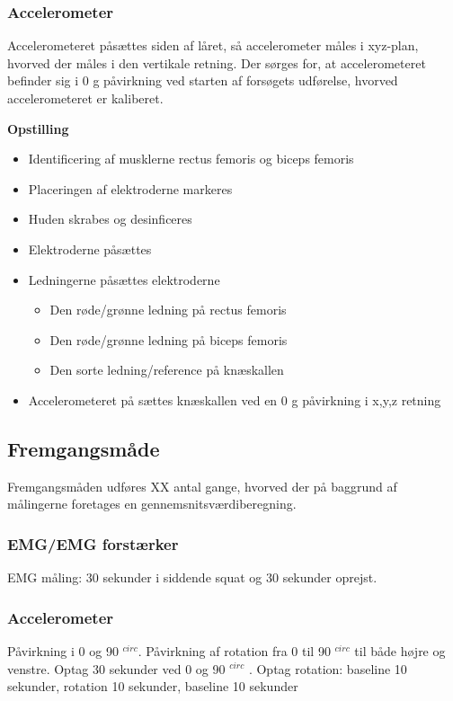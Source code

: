 \subsubsection{Accelerometer}
Accelerometeret påsættes siden af låret, så accelerometer måles i xyz-plan, hvorved der måles i den vertikale retning. Der sørges for,  at accelerometeret befinder sig i 0 g påvirkning ved starten af forsøgets udførelse, hvorved accelerometeret er kaliberet. 

\textbf{Opstilling}
\begin{itemize}
\item Identificering af musklerne rectus femoris og biceps femoris 
\item Placeringen af elektroderne markeres
\item Huden skrabes og desinficeres
\item Elektroderne påsættes
\item Ledningerne påsættes elektroderne
\begin{itemize}
\item Den røde/grønne ledning på rectus femoris
\item Den røde/grønne ledning på biceps femoris
\item Den sorte ledning/reference på knæskallen 
\end{itemize} 
\item Accelerometeret på sættes knæskallen ved en 0 g påvirkning i x,y,z retning
\end{itemize}


\subsection{Fremgangsmåde}
Fremgangsmåden udføres XX antal gange, hvorved der på baggrund af målingerne foretages en gennemsnitsværdiberegning.

\subsubsection{EMG/EMG forstærker}
EMG måling: 30 sekunder i siddende squat og 30 sekunder oprejst.

\subsubsection{Accelerometer}
Påvirkning i 0 og 90 $^{circ}$.
Påvirkning af rotation fra 0 til 90 $^{circ}$ til både højre og venstre.
Optag 30 sekunder ved 0 og 90 $^{circ}$ .
Optag rotation: baseline 10 sekunder, rotation 10 sekunder, baseline 10 sekunder




